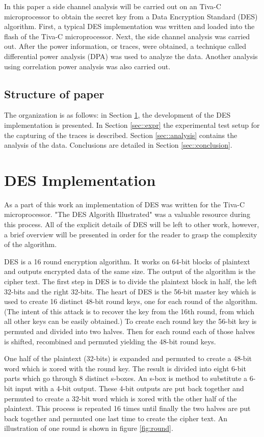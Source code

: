 	In this paper a side channel analysis will be carried out on an Tiva-C  microprocessor to obtain the secret key from a Data Encryption Standard (DES) algorithm.  First, a typical DES implementation was written and loaded into the flash of the Tiva-C microprocessor.  Next, the side channel analysis was carried out.  After the power information, or traces, were obtained, a technique called differential power analysis (DPA) was used to analyze the data.  Another analysis using correlation power analysis was also carried out.  \cite{des} \cite{Messerges}


\subsection{Structure of paper}
	The organization is as follows: in Section \ref{sec::des_impl}, the development of the DES implementation is presented.  In Section \ref{sec::expr} the experimental test setup for the capturing of the traces is described. Section \ref{sec::analysis} contains the analysis of the data.  Conclusions are detailed in Section \ref{sec::conclusion}. 


\section{DES Implementation} \label{sec::des_impl}
	As a part of this work an implementation of DES was written for the Tiva-C microprocessor.  "The DES Algorith Illustrated" was a valuable resource during this process.  All of the explicit details of DES will be left to other work, however, a brief overview will be presented in order for the reader to grasp the complexity of the algorithm. \cite{des}

	DES is a 16 round encryption algorithm.  It works on 64-bit blocks of plaintext and outputs encrypted data of the same size.  The output of the algorithm is the cipher text.  The first step in DES is to divide the plaintext block in half, the left 32-bits and the right 32-bits.  The heart of DES is the 56-bit master key which is used to create 16 distinct 48-bit round keys, one for each round of the algorithm.  (The intent of this attack is to recover the key from the 16th round, from which all other keys can be easily obtained.)  To create each round key the 56-bit key is permuted and divided into two halves.  Then for each round each of those halves is shifted, recombined and permuted yielding the 48-bit round keys.

	One half of the plaintext (32-bits) is expanded and permuted to create a 48-bit word which is xored with the round key.  The result is divided into eight 6-bit parts which go through 8 distinct s-boxes.  An s-box is  method to substitute a 6-bit input with a 4-bit output.  These 4-bit outputs are put back together and permuted to create a 32-bit word which is xored with the other half of the plaintext.  This process is repeated 16 times until finally the two halves are put back together and permuted one last time to create the cipher text.  An illustration of one round is shown in figure \ref{fig:round}.

